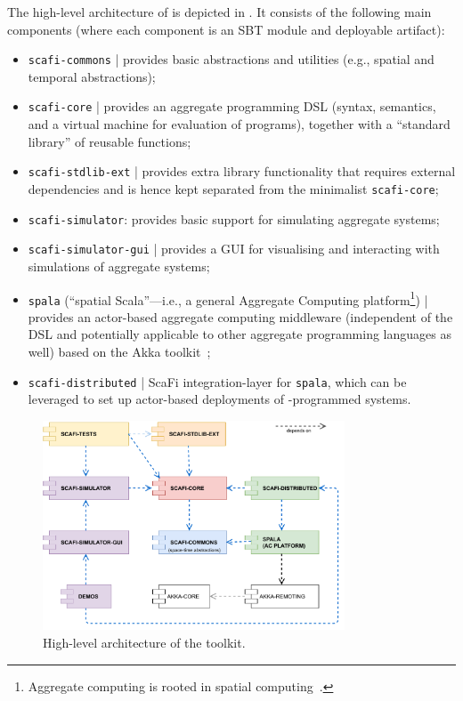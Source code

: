 
The high-level architecture of \scafi{} is depicted in .
It consists of the following main components (where each component is an SBT module and deployable artifact):
\begin{itemize}
\item \texttt{scafi-commons} | provides basic abstractions and utilities (e.g., spatial and temporal abstractions);
\item \texttt{scafi-core} | provides an aggregate programming DSL (syntax, semantics, and a virtual machine for evaluation of programs), together with a ``standard library'' of reusable functions;
\item \texttt{scafi-stdlib-ext} | provides extra library functionality that requires external dependencies and is hence kept separated from the minimalist \texttt{scafi-core};
\item \texttt{scafi-simulator}: provides basic support for simulating aggregate systems;
\item \texttt{scafi-simulator-gui} | provides a GUI for visualising and interacting with simulations of aggregate systems;
\item \texttt{spala} (``spatial Scala''---i.e., a general Aggregate Computing platform\footnote{Aggregate computing is rooted in spatial computing~\cite{DBLP:journals/corr/abs-1202-5509}.}) | provides an actor-based aggregate computing middleware
(independent of the \scafi{} DSL and potentially applicable to other aggregate programming languages as well)
based on the Akka toolkit~\cite{akka};
\item \texttt{scafi-distributed} | ScaFi integration-layer for \texttt{spala},
which can be leveraged to set up actor-based deployments of \scafi{}-programmed systems.
\end{itemize}

\begin{figure}
\centering
\includegraphics[width=0.8\textwidth]{papers/softwarex2021/imgs/scafi-project-org.pdf}
\caption{High-level architecture of the \scafi{} toolkit.}
\label{fig:scafi-arch}
\end{figure}

